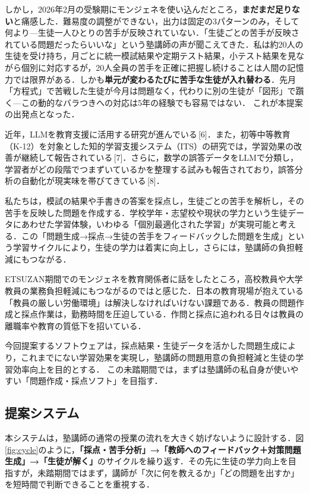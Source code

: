 \documentclass[paper=a4,fontsize=10.5bp,jafontsize=10.5bp,twocolumn]{jlreq}
\begin{document}
しかし，2026年2月の受験期にモンジェネを使い込んだところ，\textbf{まだまだ足りない}と痛感した．難易度の調整ができない，出力は固定の3パターンのみ，そして何より---生徒一人ひとりの苦手が反映されていない．「生徒ごとの苦手が反映されている問題だったらいいな」という塾講師の声が聞こえてきた．私は約20人の生徒を受け持ち，月ごとに統一模試結果や定期テスト結果，小テスト結果を見ながら個別に対応するが，20人全員の苦手を正確に把握し続けることは人間の記憶力では限界がある．しかも\textbf{単元が変わるたびに苦手な生徒が入れ替わる}．先月「方程式」で苦戦した生徒が今月は問題なく，代わりに別の生徒が「図形」で躓く---この動的なバラつきへの対応は5年の経験でも容易ではない． これが本提案の出発点となった．

近年，LLMを教育支援に活用する研究が進んでいる\,[6]．また，初等中等教育（K-12）を対象とした知的学習支援システム（ITS）の研究では，学習効果の改善が継続して報告されている\,[7]．さらに，数学の誤答データをLLMで分類し，学習者がどの段階でつまずいているかを整理する試みも報告されており，誤答分析の自動化が現実味を帯びてきている\,[8]．

私たちは，模試の結果や手書きの答案を採点し，生徒ごとの苦手を解析し，その苦手を反映した問題を作成する．学校学年・志望校や現状の学力という生徒データにあわせた学習体験，いわゆる「個別最適化された学習」が実現可能と考える．この「問題生成→採点→生徒の苦手をフィードバックした問題を生成」という学習サイクルにより，生徒の学力は着実に向上し，さらには，塾講師の負担軽減にもつながる．

ETSUZAN期間でのモンジェネを教育関係者に話をしたところ，高校教員や大学教員の業務負担軽減にもつながるのではと感じた．日本の教育現場が抱えている「教員の厳しい労働環境」は解決しなければいけない課題である．教員の問題作成と採点作業は，勤務時間を圧迫している．作問と採点に追われる日々は教員の離職率や教育の質低下を招いている．

今回提案するソフトウェアは，採点結果・生徒データを活かした問題生成により，これまでにない学習効果を実現し，塾講師の問題用意の負担軽減と生徒の学習効率向上を目的とする．
この未踏期間では，まずは塾講師の私自身が使いやすい「問題作成・採点ソフト」を目指す．

\subsection{提案システム}

本システムは，塾講師の通常の授業の流れを大きく妨げないように設計する．図\ref{fig:cycle}のように，\textbf{「採点・苦手分析」→「教師へのフィードバック＋対策問題生成」→「生徒が解く」}のサイクルを繰り返す．その先に生徒の学力向上を目指すが，未踏期間ではまず，講師が「次に何を教えるか」「どの問題を出すか」を短時間で判断できることを重視する．
\end{document}
